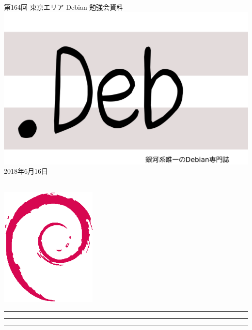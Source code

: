 \documentclass[mingoth,a4paper]{jsarticle}
\newcommand{\debmtgyear}{2018}
\newcommand{\debmtgmonth}{6}
\newcommand{\debmtgdate}{16}
\newcommand{\debmtgnumber}{164}
\begin{document}
\begin{titlepage}
\thispagestyle{empty}

\vspace*{-2cm}
第\debmtgnumber{}回 東京エリア Debian 勉強会資料\\
\hspace*{-2cm}
\includegraphics{image2012-natsu/dotdeb.pdf}\\
\hfill{}\debmtgyear{}年\debmtgmonth{}月\debmtgdate{}日

\\

\vspace*{-2cm}
\hfill{}\includegraphics[height=6cm]{image200502/openlogo-nd.eps}
\end{titlepage}

\newpage

\begin{minipage}[b]{0.2\hsize}
 \colorbox{titleback}{}
\end{minipage}
\begin{minipage}[b]{0.8\hsize}
\hrule
\vspace{2mm}
\hrule
\begin{multicols}{2}
\tableofcontents
\end{multicols}
\vspace{2mm}
\hrule
\end{minipage}
\end{document}
